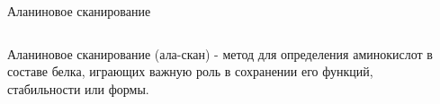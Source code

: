 \documentclass[12pt, xcolor={dvipsnames}]{beamer}
\begin{document}
\begin{frame}{Аланиновое сканирование}

\begin{columns}
\begin{column}{0.5\textwidth}
Аланиновое сканирование (ала-скан) - метод для определения аминокислот в составе белка, играющих важную роль в сохранении его функций, стабильности или формы.
\begin{center}
\end{center}
\end{column}
\begin{column}{0.5\textwidth}
\begin{center}
\resizebox{!}{\textwidth}{
\ttfamily
\footnotesize
\aapicture
}
\end{center}
\end{column}

\end{columns}


\end{frame}
\end{document}
